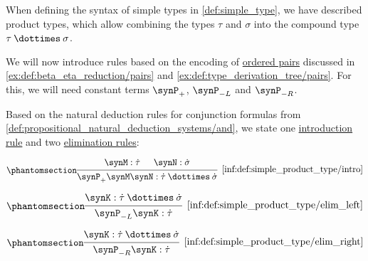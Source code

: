 \begin{definition}\label{def:simple_product_type}\mimprovised
  When defining the syntax of simple types in \cref{def:simple_type}, we have described product types, which allow combining the types \( \tau \) and \( \sigma \) into the compound type \( \tau \syntimes \sigma \).

  We will now introduce rules based on the encoding of \hyperref[def:ordered_tuple]{ordered pairs} discussed in \cref{ex:def:beta_eta_reduction/pairs} and \cref{ex:def:type_derivation_tree/pairs}. For this, we will need constant terms \( \synP_+ \), \( \synP_{-L} \) and \( \synP_{-R} \).

  Based on the natural deduction rules for conjunction formulas from \cref{def:propositional_natural_deduction_systems/and}, we state one \hyperref[rem:type_theory_rule_classification/intro]{introduction rule} and two \hyperref[rem:type_theory_rule_classification/elim]{elimination rules}:
  \begin{paracol}{3}
    \begin{nthcolumn}{0}
      \ParacolAlignmentHack
      \begin{equation*}\taglabel[\ensuremath{ \times_+ }]{inf:def:simple_product_type/intro}
        \begin{prooftree}
          \hypo{ \synM: \syn\tau }
          \hypo{ \synN: \syn\sigma }
          \infer2[\ref{inf:def:simple_product_type/intro}]{ \synP_+ \synM \synN: \syn\tau \syntimes \syn\sigma }
        \end{prooftree}
      \end{equation*}
    \end{nthcolumn}

    \begin{nthcolumn}{1}
      \ParacolAlignmentHack
      \begin{equation*}\taglabel[\ensuremath{ \times_{-L} }]{inf:def:simple_product_type/elim_left}
        \begin{prooftree}
          \hypo{ \synK: \syn\tau \syntimes \syn\sigma }
          \infer1[\ref{inf:def:simple_product_type/elim_left}]{ \synP_{-L} \synK: \syn\tau }
        \end{prooftree}
      \end{equation*}
    \end{nthcolumn}

    \begin{nthcolumn}{2}
      \ParacolAlignmentHack
      \begin{equation*}\taglabel[\ensuremath{ \times_{-R} }]{inf:def:simple_product_type/elim_right}
        \begin{prooftree}
          \hypo{ \synK: \syn\tau \syntimes \syn\sigma }
          \infer1[\ref{inf:def:simple_product_type/elim_right}]{ \synP_{-R} \synK: \syn\tau }
        \end{prooftree}
      \end{equation*}
    \end{nthcolumn}
  \end{paracol}
\end{definition}
